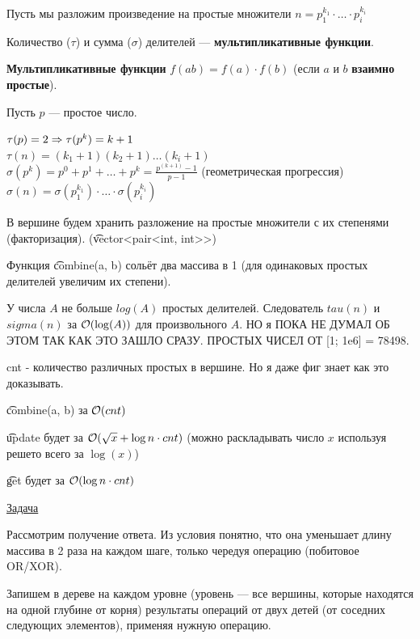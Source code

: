 
Пусть мы разложим произведение на простые множители $n = p_1^{k_1} \cdot \ldots \cdot p_i^{k_i}$

Количество ($\tau$) и сумма ($\sigma$) делителей --- {\bf мультипликативные функции}.

{\bf Мультипликативные функции} $f(ab) = f(a) \cdot f(b)$ (если $a$ и $b$ {\bf взаимно простые}). 

Пусть $p$ --- простое число.

$\tau(p) = 2 \Rightarrow \tau(p^k) = k + 1$ \\
$\tau(n) = (k_1+1) (k_2+1) \ldots (k_i+1)$ \\
$\sigma(p ^ k) = p^0 + p^1 + \ldots + p^k = \frac{p^(k + 1) - 1}{p - 1}$ (геометрическая прогрессия) \\
$\sigma(n) = \sigma(p_1^{k_1}) \cdot \ldots \cdot \sigma(p_i^{k_i})$

\down

В вершине будем хранить разложение на простые множители с их степенями (факторизация). (\t{vector<pair<int, int>>})

Функция \t{combine(a, b)} сольёт два массива в 1 (для одинаковых простых делителей увеличим их степени).


У числа $A$ не больше $log(A)$ простых делителей. Следователь $tau(n)$ и $sigma(n)$ за $\mathcal{O}(\log(A))$ для произвольного $A$. НО я ПОКА НЕ ДУМАЛ ОБ ЭТОМ ТАК КАК ЭТО ЗАШЛО СРАЗУ. ПРОСТЫХ ЧИСЕЛ ОТ [1; 1e6] = 78498.

cnt - количество различных простых в вершине. Но я даже фиг знает как это доказывать.

\t{combine(a, b)} за $\mathcal{O}(cnt)$

\t{update} будет за $\mathcal{O}(\sqrt x + \log n \cdot cnt)$ (можно раскладывать число $x$ используя решето всего за $\log(x)$)

\t{get} будет за $\mathcal{O}(\log n \cdot cnt)$


\href{https://codeforces.com/contest/339/problem/D}{Задача}
\href{https://codeforces.com/contest/339/submission/105829607}{}

Рассмотрим получение ответа. Из условия понятно, что она уменьшает длину массива в 2 раза на каждом шаге, только чередуя операцию (побитовое OR/XOR). 

Запишем в дереве на каждом уровне (уровень --- все вершины, которые находятся на одной глубине от корня) результаты операций от двух детей (от соседних следующих элементов), применяя нужную операцию.

